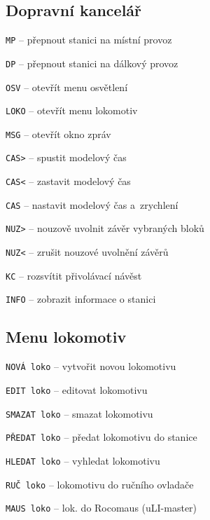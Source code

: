 \documentclass[12pt,a4paper,landscape]{article}
\begin{document}
\begin{multicols}{3}

\section{Dopravní kancelář}
\begin{compactitem}
	\item \texttt{MP} -- přepnout stanici na místní provoz
	\item \texttt{DP} -- přepnout stanici na dálkový provoz
	\item \texttt{OSV} -- otevřít menu osvětlení
	\item \texttt{LOKO} -- otevřít menu lokomotiv
	\item \texttt{MSG} -- otevřít okno zpráv
	\item \texttt{CAS>} -- spustit modelový čas
	\item \texttt{CAS<} -- zastavit modelový čas
	\item \texttt{CAS} -- nastavit modelový čas	a~zrychlení
	\item \texttt{NUZ>} -- nouzově uvolnit závěr vybraných bloků
	\item \texttt{NUZ<} -- zrušit nouzové uvolnění závěrů
	\item \texttt{KC} -- rozsvítit přivolávací návěst
	\item \texttt{INFO} -- zobrazit informace o stanici
\end{compactitem}

\subsection{Menu lokomotiv}
\begin{compactitem}
	\item \texttt{NOVÁ loko} -- vytvořit novou lokomotivu
	\item \texttt{EDIT loko} -- editovat lokomotivu
	\item \texttt{SMAZAT loko} -- smazat lokomotivu
	\item \texttt{PŘEDAT loko} -- předat lokomotivu do stanice
	\item \texttt{HLEDAT loko} -- vyhledat lokomotivu
	\item \texttt{RUČ loko} -- lokomotivu do ručního ovladače
	\item \texttt{MAUS loko} -- lok. do Rocomaus (uLI-master)
\end{compactitem}


\end{multicols}
\end{document}

